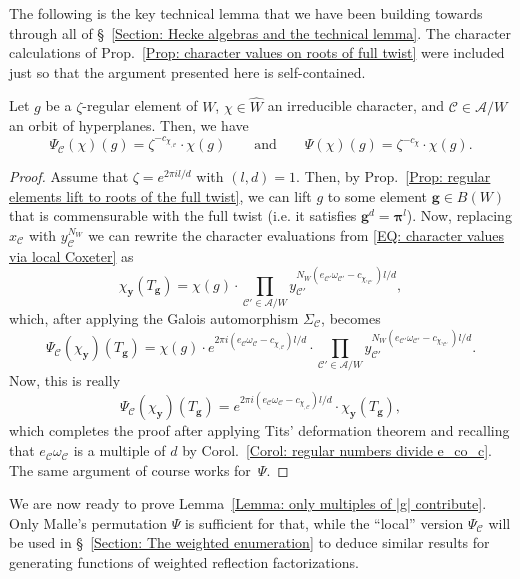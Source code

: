 The following is the key technical lemma that we have been building towards through all of \S~\ref{Section: Hecke algebras and the technical lemma}. The character calculations of Prop.~\ref{Prop: character values on roots of full twist} were included just so that the argument presented here is self-contained.

\begin{prop}\label{Prop: The key technical lemma}
Let $g$ be a $\zeta$-regular element of $W$, $\chi\in\widehat{W}$ an irreducible character, and $\mathcal{C}\in\mathcal{A}/W$ an orbit of hyperplanes. Then, we have $$\Psi_{\mathcal{C}}(\chi)(g)= \zeta^{-c_{\chi_{,\mathcal{C}}}}\cdot\chi(g) \quad \quad\text{and}\quad\quad\Psi(\chi)(g)= \zeta^{-c_{\chi}}\cdot \chi(g).$$
\end{prop}
\begin{proof}
Assume that $\zeta=e^{2\pi il/d}$ with $(l,d)=1$. Then, by Prop.~\ref{Prop: regular elements lift to roots of the full twist}, we can lift  $g$ to some element $\bm g\in B(W)$ that is commensurable with the full twist (i.e. it satisfies $\bm g^d=\bm \pi^l$). Now, replacing $x_\mathcal{C}$ with $y_{\mathcal{C}}^{N_W}$ we can rewrite the character evaluations from \eqref{EQ: character values via local Coxeter} as $$\chi_{\bm y}(T_{\bm g})=\chi(g)\cdot\prod_{\mathcal{C}'\in\mathcal{A}/W}y_{\mathcal{C}'}^{N_W(e_{\mathcal{C}'}\omega_{\mathcal{C}'}-c_{\chi,_{\mathcal{C}'}})l/d}, $$
which, after applying the Galois automorphism $\Sigma_{\mathcal{C}}$, becomes
$$ \Psi_{\mathcal{C}}(\chi_{\bm y})(T_{\bm g})= \chi(g)\cdot e^{2\pi i(e_{\mathcal{C}}\omega_{\mathcal{C}}-c_{\chi_{,\mathcal{C}}})l/d }\cdot \prod_{\mathcal{C}'\in\mathcal{A}/W}y_{\mathcal{C}'}^{N_W(e_{\mathcal{C}'}\omega_{\mathcal{C}'}-c_{\chi,_{\mathcal{C}'}})l/d}. $$ 
Now, this is really 
$$ \Psi_{\mathcal{C}}(\chi_{\bm y})(T_{\bm g})=e^{2\pi i(e_{\mathcal{C}}\omega_{\mathcal{C}}-c_{\chi_{,\mathcal{C}}})l/d }\cdot\chi_{\bm y}(T_{\bm g}),$$ which completes the proof after applying Tits' deformation theorem and recalling that $e_{\mathcal{C}}\omega_{\mathcal{C}}$ is a multiple of $d$ by Corol.~\ref{Corol: regular numbers divide e_co_c}. The same argument of course works for~$\Psi$.
\end{proof}

We are now ready to prove Lemma~\ref{Lemma: only multiples of |g| contribute}. Only Malle's permutation $\Psi$ is sufficient for that, while the ``local'' version $\Psi_{\mathcal{C}}$ will be used in \S~\ref{Section: The weighted enumeration} to deduce similar results for generating functions of  weighted reflection factorizations. 


